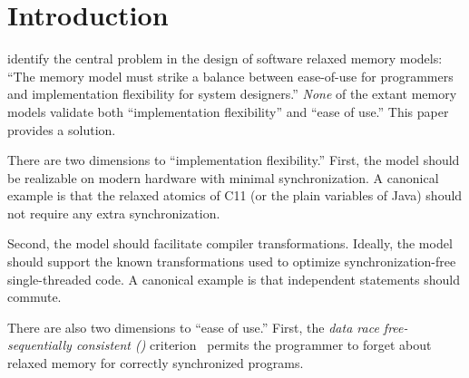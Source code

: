 \section{Introduction}
\label{sec:intro}
\citet{Manson:2005:JMM:1047659.1040336} identify the central problem in the design of software relaxed memory models: ``The memory model must strike a balance between ease-of-use for programmers and implementation flexibility for system designers.''   \emph{None} of the extant memory models validate both ``implementation flexibility'' and ``ease of use.''   This paper provides a solution.


There are two dimensions to ``implementation flexibility.''  First, the model should be realizable on modern hardware with minimal synchronization.  A canonical example is that the relaxed atomics of C11 (or the plain variables of Java) should not require any extra synchronization.

Second, the  model should facilitate compiler transformations.    Ideally, the model should support the known transformations used to optimize  synchronization\hyp{}free single\hyp{}threaded code.  A canonical example is that independent statements should commute.


There are also two dimensions to ``ease of use.''  First, the \emph{data race free-sequentially consistent (\drfsc)} criterion~\cite{DBLP:journals/tpds/AdveH93, DBLP:conf/isca/AdveH90} permits the programmer to forget about relaxed memory for correctly synchronized programs.

